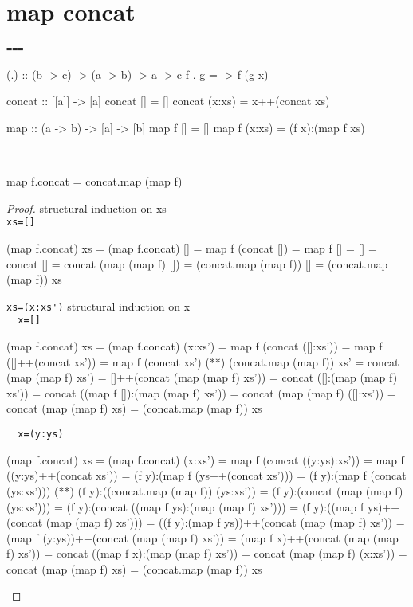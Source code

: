 \section{map concat}
\verb|===|\\
\begin{code}
(.) :: (b -> c) -> (a -> b) -> a -> c
f . g = \x -> f (g x)
\end{code}
\begin{code}
concat :: [[a]] -> [a]
concat []     = []
concat (x:xs) = x++(concat xs)
\end{code}
\begin{code}
map :: (a -> b) -> [a] -> [b] 
map f []     = []
map f (x:xs) = (f x):(map f xs)
\end{code}
\begin{claim}\ 
\begin{code}
map f.concat = concat.map (map f)
\end{code}
\end{claim}
\begin{proof}structural induction on xs\\
\verb|xs=[]|
\begin{code}
(map f.concat) xs = (map f.concat) []
                  = map f (concat [])
                  = map f []
                  = []
                  = concat []
                  = concat (map (map f) [])
                  = (concat.map (map f)) []
                  = (concat.map (map f)) xs
\end{code}
\verb|xs=(x:xs')|
structural induction on x\\
\verb|  x=[]|
\begin{code}
(map f.concat) xs = (map f.concat) (x:xs')
                  = map f (concat ([]:xs'))
                  = map f ([]++(concat xs'))
                  = map f (concat xs')
                  (**) (concat.map (map f)) xs'
                  = concat (map (map f) xs')
                  = []++(concat (map (map f) xs'))
                  = concat ([]:(map (map f) xs'))
                  = concat ((map f []):(map (map f) xs'))
                  = concat (map (map f) ([]:xs'))
                  = concat (map (map f) xs)
                  = (concat.map (map f)) xs
\end{code}
\verb|  x=(y:ys)|
\begin{code}
(map f.concat) xs = (map f.concat) (x:xs')
                  = map f (concat ((y:ys):xs'))
                  = map f ((y:ys)++(concat xs'))
                  = (f y):(map f (ys++(concat xs')))
                  = (f y):(map f (concat (ys:xs')))
                  (**) (f y):((concat.map (map f)) (ys:xs'))
                  = (f y):(concat (map (map f) (ys:xs')))
                  = (f y):(concat ((map f ys):(map (map f) xs')))
                  = (f y):((map f ys)++(concat (map (map f) xs')))
                  = ((f y):(map f ys))++(concat (map (map f) xs'))
                  = (map f (y:ys))++(concat (map (map f) xs'))
                  = (map f x)++(concat (map (map f) xs'))
                  = concat ((map f x):(map (map f) xs'))
                  = concat (map (map f) (x:xs'))
                  = concat (map (map f) xs)
                  = (concat.map (map f)) xs
\end{code}
\end{proof}
